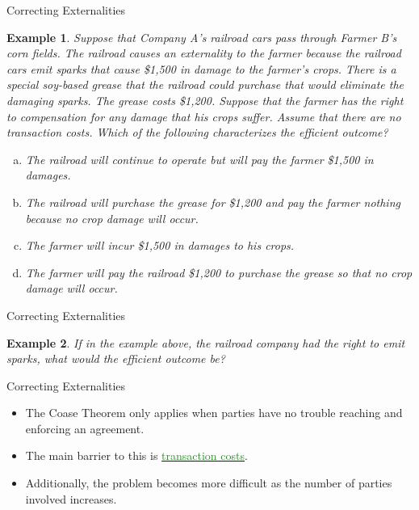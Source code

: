\documentclass[xcolor={dvipsnames},pdf, hyperref={colorlinks=true, citecolor=ForestGreen, linkcolor=BlueViolet, urlcolor=Magenta}]{beamer}
\newtheorem{exmp}{Example}[section]
\newcommand{\ddp}[1]{{\textcolor{ForestGreen}{#1}}}
\newcommand{\dd}[1]{{\underline{\textcolor{ForestGreen}{#1}}}}
\begin{document}
\begin{frame}{Correcting Externalities}
 \begin{exmp}
		\scriptsize
		Suppose that Company A's railroad cars pass through Farmer B's corn fields. The railroad causes an externality to the farmer because the railroad cars emit sparks that cause \$1,500 in damage to the farmer's crops. There is a special soy-based grease that the railroad could purchase that would eliminate the damaging sparks. The grease costs \$1,200. Suppose that the farmer has the right to compensation for any damage that his crops suffer. Assume that there are no transaction costs. Which of the following characterizes the efficient outcome?
		
		\begin{enumerate}[(a)]
			\item The railroad will continue to operate but will pay the farmer \$1,500 in damages.
			\item The railroad will purchase the grease for \$1,200 and pay the farmer nothing because no crop damage will occur.
			\item The farmer will incur \$1,500 in damages to his crops.
			\item The farmer will pay the railroad \$1,200 to purchase the grease so that no crop damage
			will occur.
		\end{enumerate}
	\end{exmp}
	\small 
\pause	\ddp{(b) The farmer has the rights, so the railroad has to pay compensation. They would rather pay \$1,200 to buy grease for their cars than pay \$1,500 for compensation.\\}
\end{frame}

\begin{frame}{Correcting Externalities}
\begin{exmp}
	If in the example above, the railroad company had the right to emit sparks, what would the efficient outcome be?
\end{exmp} 
\pause \ddp{(d) The farmer has to compensate the railroad in order for them not to emit sparks. He will pay \$1,200 rather than incurring \$1,500 in crop damages.}
\end{frame}

\begin{frame}{Correcting Externalities}
\begin{itemize}
	\item The Coase Theorem only applies when parties have no trouble reaching and enforcing an agreement. 
	\item The main barrier to this is \dd{transaction costs}. 
	\item Additionally, the problem becomes more difficult as the number of parties involved increases.
\end{itemize}
\end{frame}
\end{document}
